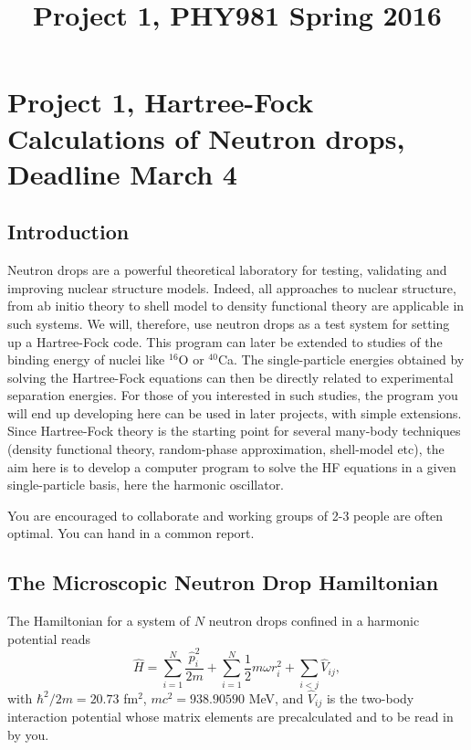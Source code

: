 \documentclass[11pt,a4wide]{article}
\begin{document}
\title{Project 1,  PHY981 Spring 2016}
\maketitle
\section*{Project 1, Hartree-Fock Calculations of Neutron drops, Deadline March 4}


\subsection*{Introduction}

Neutron drops are a powerful theoretical laboratory for testing,
validating and improving nuclear structure models. Indeed, all
approaches to nuclear structure, from ab initio theory to shell model
to density functional theory are applicable in such systems. We will,
therefore, use neutron drops as a test system for setting up a
Hartree-Fock code.  This program can later be extended to studies of
the binding energy of nuclei like $^{16}$O or $^{40}$Ca. The
single-particle energies obtained by solving the Hartree-Fock
equations can then be directly related to experimental separation
energies. For those of you interested in such studies, the program you
will end up developing here can be used in later projects, with simple
extensions.  Since Hartree-Fock theory is the starting point for
several many-body techniques (density functional theory, random-phase
approximation, shell-model etc), the aim here is to develop a computer
program to solve the HF equations in a given single-particle basis,
here the harmonic oscillator.

You are encouraged to collaborate and working groups of 2-3 people are
often optimal. You can hand in a common report.


\subsection*{The Microscopic Neutron Drop Hamiltonian}

The Hamiltonian for a system of $N$ neutron drops confined in a
harmonic potential reads
\begin{equation}
\hat{H} 
= 
\sum_{i=1}^{N} \frac{\hat{p}_{i}^{2}}{2m}
+
\sum_{i=1}^{N} \frac{1}{2} m\omega {r}_{i}^{2}
+
\sum_{i<j} \hat{V}_{ij},
\end{equation}
with $\hbar^{2}/2m = 20.73$ fm$^{2}$, $mc^{2} = 938.90590$ MeV, and 
$\hat{V}_{ij}$ is the two-body interaction potential whose 
matrix elements are precalculated
and to be read in by you.
\end{document}
